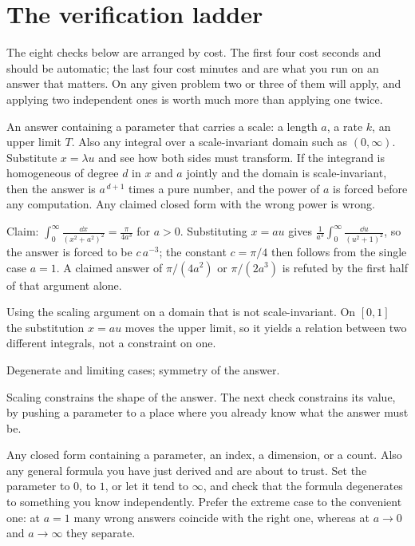 \section{The verification ladder}

The eight checks below are arranged by cost. The first four cost seconds and should be automatic; the last four cost minutes and are what you run on an answer that matters. On any given problem two or three of them will apply, and applying two independent ones is worth much more than applying one twice.

\cue An answer containing a parameter that carries a scale: a length $a$, a rate $k$, an upper limit $T$. Also any integral over a scale-invariant domain such as $(0,\infty)$.
\method Substitute $x=\lambda u$ and see how both sides must transform. If the integrand is homogeneous of degree $d$ in $x$ and $a$ jointly and the domain is scale-invariant, then the answer is $a^{\,d+1}$ times a pure number, and the power of $a$ is forced before any computation. Any claimed closed form with the wrong power is wrong.

\begin{worked}
Claim: $\displaystyle\int_{0}^{\infty}\frac{\dd x}{(x^{2}+a^{2})^{2}}=\frac{\pi}{4a^{3}}$ for $a>0$. Substituting $x=au$ gives $\frac{1}{a^{3}}\int_{0}^{\infty}\frac{\dd u}{(u^{2}+1)^{2}}$, so the answer is forced to be $c\,a^{-3}$; the constant $c=\pi/4$ then follows from the single case $a=1$. A claimed answer of $\pi/(4a^{2})$ or $\pi/(2a^{3})$ is refuted by the first half of that argument alone.
\end{worked}

\begin{trap}
Using the scaling argument on a domain that is not scale-invariant. On $[0,1]$ the substitution $x=au$ moves the upper limit, so it yields a relation between two different integrals, not a constraint on one.
\end{trap}

\begin{seealsob}Degenerate and limiting cases; symmetry of the answer.\end{seealsob}

Scaling constrains the shape of the answer. The next check constrains its value, by pushing a parameter to a place where you already know what the answer must be.

\cue Any closed form containing a parameter, an index, a dimension, or a count. Also any general formula you have just derived and are about to trust.
\method Set the parameter to $0$, to $1$, or let it tend to $\infty$, and check that the formula degenerates to something you know independently. Prefer the extreme case to the convenient one: at $a=1$ many wrong answers coincide with the right one, whereas at $a\to 0$ and $a\to\infty$ they separate.

